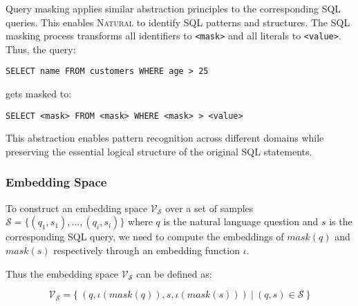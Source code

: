 Query masking applies similar abstraction principles to the corresponding SQL queries.
This enables \textsc{Natural} to identify SQL patterns and structures.
The SQL masking process transforms all identifiers to \texttt{<mask>} and all
literals to \texttt{<value>}. Thus, the query:

\begin{verbatim}
SELECT name FROM customers WHERE age > 25
\end{verbatim}

gets masked to:

\begin{verbatim}
SELECT <mask> FROM <mask> WHERE <mask> > <value>
\end{verbatim}

This abstraction enables pattern recognition across different domains while
preserving the essential logical structure of the original SQL statements.

\subsubsection{Embedding Space}

To construct an embedding space $\mathcal{V}_{\mathcal{S}}$ over a set of samples $\mathcal{S} = \{(q_1, s_1), ..., (q_i, s_i)\}$
where $q$ is the natural language question and $s$ is the corresponding SQL query, we need to compute
the embeddings of $mask(q)$ and $mask(s)$ respectively through an embedding function $\iota$.

Thus the embedding space $\mathcal{V}_{\mathcal{S}}$ can be defined as:

$$\mathcal{V}_{\mathcal{S}} = \{~(q, \iota(mask(q)), s, \iota(mask(s)))~|~(q, s) \in \mathcal{S}~\}$$
